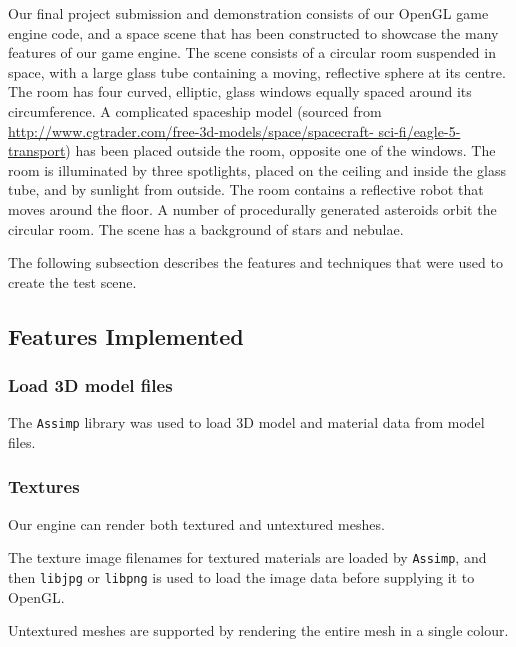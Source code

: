 \documentclass[11pt]{scrartcl} %
\newcommand{\libraryname}[1]{{\texttt{#1}}}
\begin{document}
    Our final project submission and demonstration consists of our OpenGL game
    engine code, and a space scene that has been constructed to showcase the
    many features of our game engine. The scene consists of a circular room
    suspended in space, with a large glass tube containing a moving, reflective
    sphere at its centre. The room has four curved, elliptic, glass windows
    equally spaced around its circumference. A complicated spaceship model
    (sourced from \url{http://www.cgtrader.com/free-3d-models/space/spacecraft-
    sci-fi/eagle-5-transport}) has been placed outside the room, opposite one
    of the windows. The room is illuminated by three spotlights, placed on the
    ceiling and inside the glass tube, and by sunlight from outside. The room
    contains a reflective robot that moves around the floor.
    A number of procedurally generated asteroids orbit the circular room.
    The scene has a background of stars and nebulae.


    The following subsection describes the features and techniques that were
    used to create the test scene.

    \subsection{Features Implemented}

        \subsubsection{Load 3D model files}

            The \libraryname{Assimp} library was used to load 3D model and
            material data from model files.

        \subsubsection{Textures}

            Our engine can render both textured and untextured meshes.

            The texture image filenames for textured materials are loaded by
            \libraryname{Assimp}, and then \libraryname{libjpg} or
            \libraryname{libpng} is used to load the image data before
            supplying it to OpenGL.

            Untextured meshes are supported by rendering the entire mesh in a
            single colour.
\end{document}
